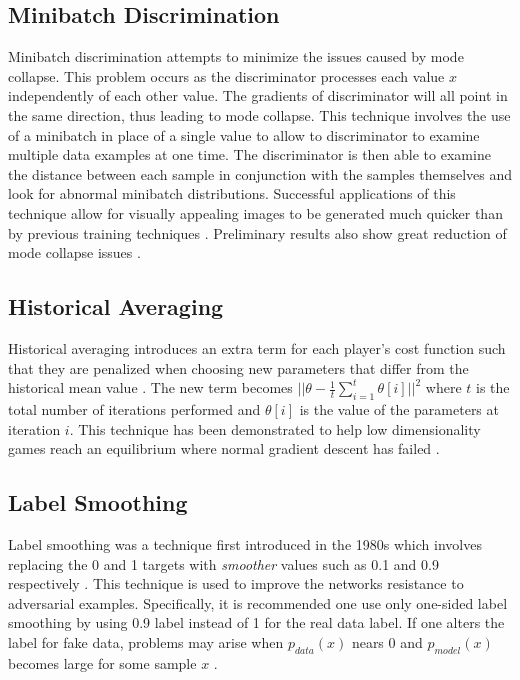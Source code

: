 \documentclass[11pt]{article}
\begin{document}
\subsection{Minibatch Discrimination} \label{sec:minidisc}
Minibatch discrimination attempts to minimize the issues caused by mode collapse. This problem occurs as the discriminator processes each value $x$ independently of each other value. The gradients of discriminator will all point in the same direction, thus leading to mode collapse. This technique involves the use of a minibatch in place of a single value to allow to discriminator to examine multiple data examples at one time. The discriminator is then able to examine the distance between each sample in conjunction with the samples themselves and look for abnormal minibatch distributions. Successful applications of this technique allow for visually appealing images to be generated much quicker than by previous training techniques \citep{2016arXiv160603498S}. Preliminary results also show great reduction of mode collapse issues \citep{2017arXiv170100160G}.

\subsection{Historical Averaging}
Historical averaging introduces an extra term for each player's cost function such that they are penalized when choosing new parameters that differ from the historical mean value \citep{2016arXiv160603498S}. The new term becomes $||\theta - \frac{1}{t}\sum_{i=1}^{t}\theta[i]||^2$ where $t$ is the total number of iterations performed and $\theta[i]$ is the value of the parameters at iteration $i$. This technique has been demonstrated to help low dimensionality games reach an equilibrium where normal gradient descent has failed \citep{2016arXiv160603498S}.

\subsection{Label Smoothing}
Label smoothing was a technique first introduced in the 1980s which involves replacing the 0 and 1 targets with \textit{smoother} values such as 0.1 and 0.9 respectively \citep{2016arXiv160603498S}. This technique is used to improve the networks resistance to adversarial examples. Specifically, it is recommended one use only one-sided label smoothing by using 0.9 label instead of 1 for the real data label. If one alters the label for fake data, problems may arise when $p_{data}(x)$ nears $0$ and $p_{model}(x)$ becomes large for some sample $x$ \citep{2016arXiv160603498S}.
\end{document}
